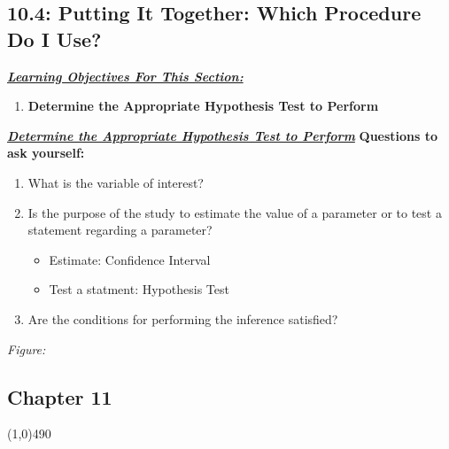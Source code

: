 \documentclass{report}
\begin{document}
    \subsection*{10.4: Putting It Together: Which Procedure Do I Use?}
    \bigbreak \noindent 
    \textbf{\textit{\underline{Learning Objectives For This Section:}}}
    \begin{enumerate}
        \item \textbf{Determine the Appropriate Hypothesis Test to Perform}
    \end{enumerate}
    \bigbreak \noindent \bigbreak \noindent 
    \textbf{\textit{\underline{Determine the Appropriate Hypothesis Test to Perform}}}
    \bigbreak \noindent 
    \textbf{Questions to ask yourself:}
    \bigbreak \noindent 
    \begin{enumerate}
        \item What is the variable of interest? 
        \item Is the purpose of the study to estimate the value of a parameter or to test a statement regarding a parameter?
            \begin{itemize}
                \item Estimate: Confidence Interval
                \item Test a statment: Hypothesis Test
            \end{itemize}
        \item Are the conditions for performing the inference satisfied? 
    \end{enumerate}
    \bigbreak \noindent 
    \textit{Figure:}
    \begin{figure}[ht]
        \centering
        \label{fig:yuyu}
    \end{figure}

    \pagebreak 
    \begin{center}
        \section*{Chapter 11}
    \end{center}
    \line(1,0){490}
    \bigbreak \noindent 
\end{document}
